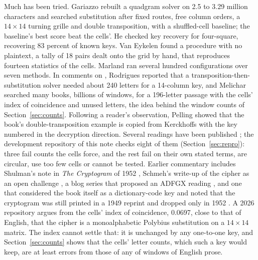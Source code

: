\documentclass[11pt]{article}
\theoremstyle{definition}
\begin{document}
Much has been tried. Gariazzo \cite{gariazzo2026,gariazzo2026code} rebuilt a quadgram solver on 2.5 to 3.29 million characters and searched substitution after fixed routes, free column orders, a $14 \times 14$ turning grille and double transposition, with a shuffled-cell baseline; the baseline's best score beat the cells'. He checked key recovery for four-square, recovering 83 percent of known keys. Van Eykelen \cite{vaneykelen2026xiv,vaneykelen2026xv} found a procedure with no plaintext, a tally of 18 pairs dealt onto the grid by hand, that reproduces fourteen statistics of the cells. Marland \cite{marland2026} ran several hundred configurations over seven methods. In comments on \cite{pelling2013}, Rodrigues reported that a transposition-then-substitution solver needed about 240 letters for a 14-column key, and Melichar searched many books, billions of windows, for a 196-letter passage with the cells' index of coincidence and unused letters, the idea behind the window counts of Section~\ref{sec:counts}. Following a reader's observation, Pelling \cite{pelling2017} showed that the book's double-transposition example is copied from Kerckhoffs \cite{kerckhoffs1883} with the key numbered in the decryption direction. Several readings have been published \cite{uygun2026,caillahua2026,leggett2025}; the development repository of this note checks eight of them (Section~\ref{sec:repro}): three fail counts the cells force, and the rest fail on their own stated terms, are circular, use too few cells or cannot be tested. Earlier commentary includes Shulman's note in \emph{The Cryptogram} of 1952 \cite{shulman1952}, Schmeh's write-up of the cipher as an open challenge \cite{schmeh2026mtc3}, a blog series that proposed an ADFGX reading \cite{pleasedecipher2010}, and one that considered the book itself as a dictionary-code key and noted that the cryptogram was still printed in a 1949 reprint and dropped only in 1952 \cite{numberworld2015}. A 2026 repository \cite{ashley2026} argues from the cells' index of coincidence, 0.0697, close to that of English, that the cipher is a monoalphabetic Polybius substitution on a $14 \times 14$ matrix. The index cannot settle that: it is unchanged by any one-to-one key, and Section~\ref{sec:counts} shows that the cells' letter counts, which such a key would keep, are at least \corpusClosestDistance{} errors from those of any of \corpusWindows{} windows of English prose.
\end{document}

